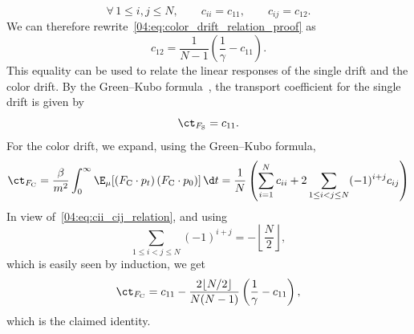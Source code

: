  \begin{equation}
 \label{04:eq:cii_cij_relation}
     \forall \,1\leq i,j\leq N,\qquad c_{ii}=c_{11},\qquad c_{ij}=c_{12}.
 \end{equation}
 We can therefore rewrite~\eqref{04:eq:color_drift_relation_proof} as 
 \begin{equation}\label{04:eq:c12_c11_relation}c_{12}=\frac{1}{N-1}\left(\frac{1}{\gamma}-c_{11}\right).\end{equation}
This equality can be used to relate the linear responses of the single drift and the color drift.
By the Green--Kubo formula~\cite{G54}, the transport coefficient for the single drift is given by
\[\ct_{F_{\mathrm{S}}}=c_{11}.\]
For the color drift, we expand, using the Green--Kubo formula,
\[\ct_{F_{\mathrm{C}}}=\frac{\beta}{m^2} \int_0^\infty \E_\mu[\left(F_{\mathrm{C}}\cdot p_t\right)\left(F_{\mathrm{C}}\cdot p_0\right)]\,\d t=\frac1N\left(\sum_{i=1}^N c_{ii} + 2\sum_{1\leq i< j\leq N}(-1)^{i+j}c_{ij}\right)\]
In view of~\eqref{04:eq:cii_cij_relation}, and using
\[\sum_{1\leq i< j\leq N}(-1)^{i+j}=-\left\lfloor \frac{N}{2}\right\rfloor,\]
which is easily seen by induction, we get
\begin{equation}
    \ct_{F_{\mathrm{C}}}=c_{11}-\frac{2\lfloor N/2 \rfloor}{N(N-1)}\left(\frac1{\gamma}-c_{11}\right),
\end{equation}
which is the claimed identity.